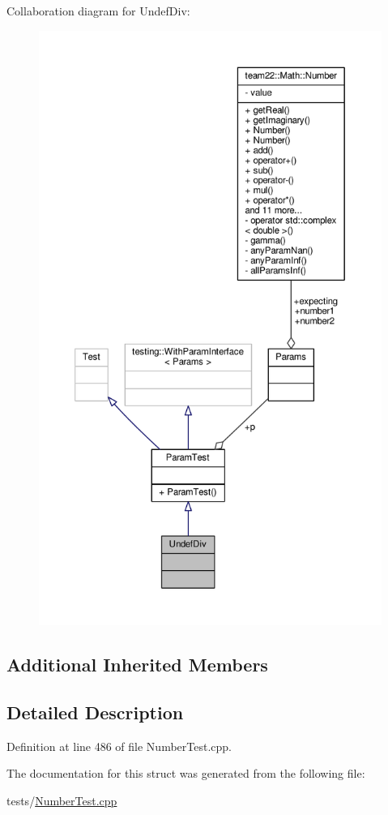 Collaboration diagram for Undef\+Div\+:
\nopagebreak
\begin{figure}[H]
\begin{center}
\leavevmode
\includegraphics[height=550pt]{struct_undef_div__coll__graph}
\end{center}
\end{figure}
\subsection*{Additional Inherited Members}


\subsection{Detailed Description}


Definition at line 486 of file Number\+Test.\+cpp.



The documentation for this struct was generated from the following file\+:\begin{DoxyCompactItemize}
\item 
tests/\hyperlink{_number_test_8cpp}{Number\+Test.\+cpp}\end{DoxyCompactItemize}
